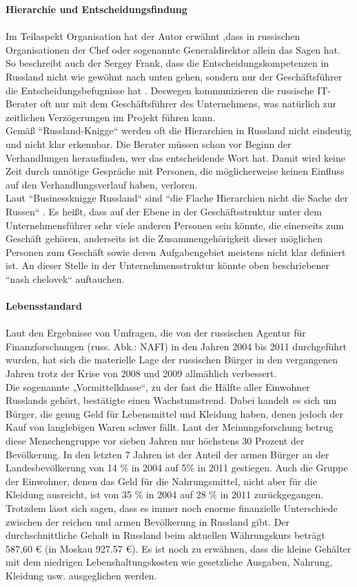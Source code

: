 	 	 \textbf{Hierarchie und Entscheidungsfindung}\\
	 	 \\
	 Im Teilaspekt Organisation hat der Autor erwähnt ,dass in russischen Organisationen der Chef oder sogenannte Generaldirektor  allein das Sagen hat. So beschreibt auch der Sergey Frank, dass die Entscheidungskompetenzen in Russland nicht wie gewöhnt nach unten gehen, sondern nur der Geschäftsführer die Entscheidungsbefugnisse hat \cite{RuSFI}.
	 Deswegen kommunizieren die russische IT-Berater oft nur mit dem Geschäftsführer des Unternehmens, was natürlich zur zeitlichen Verzögerungen im Projekt führen kann.\\
	 Gemäß ``Russland-Knigge`` \cite{RusKnigge} werden oft die Hierarchien in Russland nicht eindeutig und nicht klar erkennbar. Die Berater müssen schon vor Beginn der Verhandlungen herausfinden, wer das entscheidende Wort hat. Damit wird keine Zeit durch unnötige Gespräche mit Personen, die möglicherweise keinen Einfluss auf den Verhandlungsverlauf haben, verloren.\\
	 Laut ``Businessknigge Russland`` sind ``die Flache Hierarchien nicht die Sache der Russen`` \cite{RusKnigge}. Es heißt, dass auf der Ebene in der Geschäftsstruktur unter dem Unternehmensführer  sehr viele anderen Personen sein könnte, die einerseits zum Geschäft gehören, anderseits ist die Zusammengehörigkeit dieser möglichen Personen zum Geschäft sowie deren Aufgabengebiet meistens nicht klar definiert ist. An dieser Stelle in der Unternehmensstruktur könnte oben beschriebener ``nash chelovek`` auftauchen.
	\\ \\
		 	 \textbf{Lebensstandard}\\ \\
	Laut den Ergebnisse von Umfragen, die von der russischen Agentur für Finanzforschungen (russ. Abk.: NAFI) in den Jahren 2004 bis 2011 durchgeführt wurden, hat sich die materielle Lage der russischen Bürger in den vergangenen  Jahren trotz der Krise von 2008 und 2009 allmählich verbessert.\\
	 Die sogenannte „Vormittelklasse“, zu der fast die Hälfte aller Einwohner Russlands gehört, bestätigte einen Wachstumstrend. Dabei handelt es sich um Bürger, die genug Geld für Lebensmittel und Kleidung haben, denen jedoch der Kauf von langlebigen Waren schwer fällt. Laut der Meinungsforschung betrug diese Menschengruppe vor sieben Jahren nur höchstens 30 Prozent der Bevölkerung. In den letzten 7 Jahren ist der Anteil der armen Bürger an der Landesbevölkerung von 14 \% in 2004 auf 5\% in 2011 gestiegen. Auch die Gruppe der Einwohner, denen das Geld für die Nahrungsmittel, nicht aber für die Kleidung ausreicht, ist von 35 \% in 2004 auf 28 \% in 2011 zurückgegangen.\\
	 Trotzdem lässt sich sagen, dass es immer noch enorme finanzielle Unterschiede zwischen der reichen und armen Bevölkerung in Russland gibt. Der durchschnittliche Gehalt in Russland beim aktuellen Währungskurs beträgt 587,60 € (in Moskau 927.57 €). Es ist noch zu erwähnen, dass die kleine Gehälter mit dem niedrigen Lebenshaltungskosten wie gesetzliche Ausgaben, Nahrung, Kleidung usw. ausgeglichen werden. 
